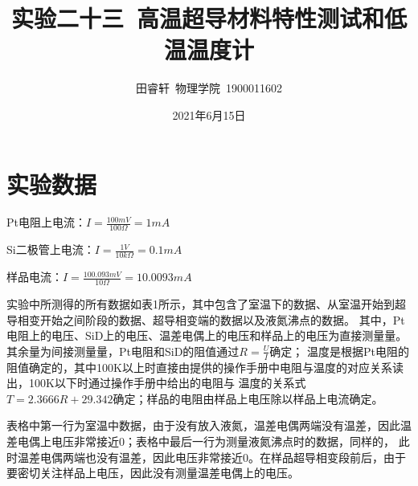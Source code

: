 \documentclass{article}
\title{\heiti 实验二十三\ 高温超导材料特性测试和低温温度计}
\author{\kaishu 田睿轩\ 物理学院\ 1900011602}
\date{2021年6月15日}
\begin{document}
    \maketitle
    \section{实验数据}
    Pt电阻上电流：$I=\frac{100mV}{100\Omega}=1mA$

    Si二极管上电流：$I=\frac{1V}{10k\Omega}=0.1mA$

    样品电流：$I=\frac{100.093mV}{10\Omega}=10.0093mA$

    实验中所测得的所有数据如表1所示，其中包含了室温下的数据、从室温开始到超导相变开始之间阶段的数据、超导相变端的数据以及液氮沸点的数据。
    其中，Pt电阻上的电压、SiD上的电压、温差电偶上的电压和样品上的电压为直接测量量。其余量为间接测量量，Pt电阻和SiD的阻值通过$R=\frac{U}{I}$确定；
    温度是根据Pt电阻的阻值确定的，其中100K以上时直接由提供的操作手册中电阻与温度的对应关系读出，100K以下时通过操作手册中给出的电阻与
    温度的关系式$T=2.3666R+29.342$确定；样品的电阻由样品上电压除以样品上电流确定。

    表格中第一行为室温中数据，由于没有放入液氮，温差电偶两端没有温差，因此温差电偶上电压非常接近0；表格中最后一行为测量液氮沸点时的数据，同样的，
    此时温差电偶两端也没有温差，因此电压非常接近0。在样品超导相变段前后，由于要密切关注样品上电压，因此没有测量温差电偶上的电压。
\end{document}
